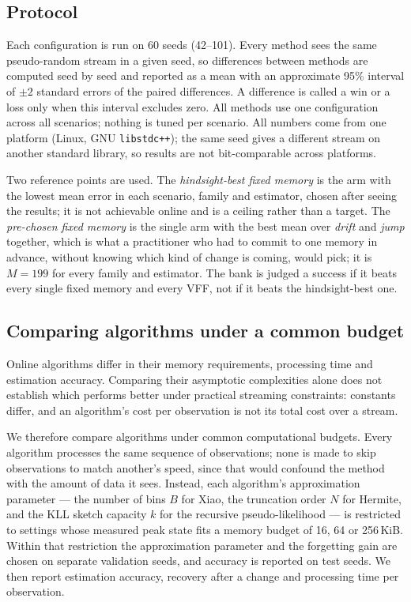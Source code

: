 \subsection{Protocol}

Each configuration is run on 60 seeds (42--101). Every method sees the same pseudo-random stream
in a given seed, so differences between methods are computed seed by seed and reported as a mean
with an approximate 95\% interval of $\pm2$ standard errors of the paired differences. A
difference is called a win or a loss only when this interval excludes zero. All methods use one
configuration across all scenarios; nothing is tuned per scenario. All numbers come from one
platform (Linux, GNU \texttt{libstdc++}); the same seed gives a different stream on another
standard library, so results are not bit-comparable across platforms.

Two reference points are used. The \emph{hindsight-best fixed memory} is the arm with the lowest
mean error in each scenario, family and estimator, chosen after seeing the results; it is not
achievable online and is a ceiling rather than a target. The \emph{pre-chosen fixed memory} is the
single arm with the best mean over \emph{drift} and \emph{jump} together, which is what a
practitioner who had to commit to one memory in advance, without knowing which kind of change is
coming, would pick; it is $M=199$ for every family and estimator. The bank is judged a success if
it beats every single fixed memory and every VFF, not if it beats the hindsight-best one.

\subsection{Comparing algorithms under a common budget}
\label{sec:comparing-algorithms}

Online algorithms differ in their memory requirements, processing time and estimation accuracy.
Comparing their asymptotic complexities alone does not establish which performs better under
practical streaming constraints: constants differ, and an algorithm's cost per observation is not
its total cost over a stream.

We therefore compare algorithms under common computational budgets. Every algorithm processes the
same sequence of observations; none is made to skip observations to match another's speed, since
that would confound the method with the amount of data it sees. Instead, each algorithm's
approximation parameter --- the number of bins $B$ for Xiao, the truncation order $N$ for Hermite,
and the KLL sketch capacity $k$ for the recursive pseudo-likelihood --- is restricted to settings
whose measured peak state fits a memory budget of 16, 64 or 256\,KiB. Within that restriction the
approximation parameter and the forgetting gain are chosen on separate validation seeds, and
accuracy is reported on test seeds. We then report estimation accuracy, recovery after a change and
processing time per observation.

